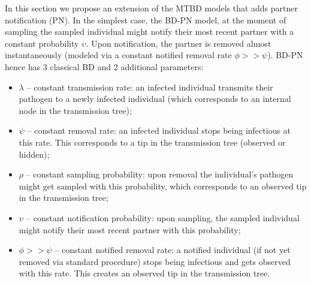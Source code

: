 \documentclass[a4paper,10pt]{article}
\begin{document}
In this section we propose an %
extension of the MTBD models that adds partner notification (PN).  In the simplest case, the BD-PN model, at the moment of sampling the sampled individual might notify their most recent partner with a constant probability $\upsilon$. Upon notification, the partner is removed almost instantaneously (modeled via a constant notified removal rate $\phi >> \psi$). BD-PN hence has 3 classical BD and 2 additional parameters:
\begin{itemize}
 \item $\lambda$ -- constant transmission rate: an infected individual transmits their pathogen to a newly infected individual (which corresponds to an internal node in the transmission tree);
 \item $\psi$ -- constant removal rate: an infected individual stops being infectious at this rate. This corresponds to a tip in the transmission tree (observed or hidden);
 \item $\rho$ -- constant sampling probability: upon removal the individual's pathogen might get sampled with this probability, which corresponds to an observed tip in the transmission tree;
 \item $\upsilon$ -- constant notification probability: upon sampling, the sampled individual might notify their most recent partner with this probability;
 \item $\phi >> \psi$ -- constant notified removal rate: a notified individual (if not yet removed via standard procedure) stops being infectious and gets observed with this rate. This creates an observed tip in the transmission tree.
\end{itemize}
\end{document}
